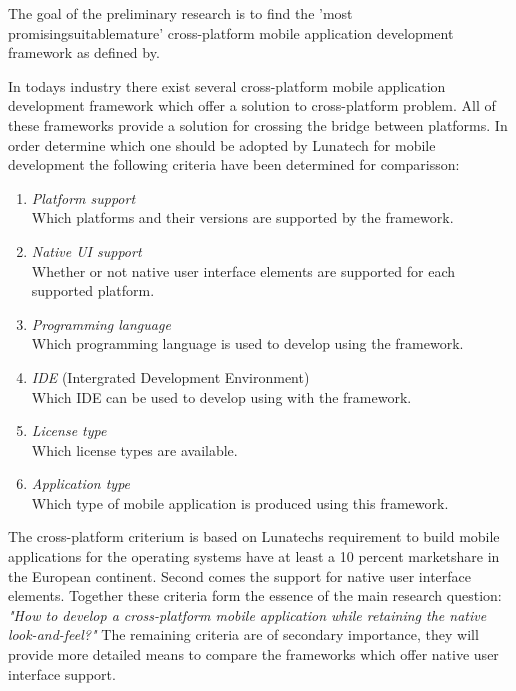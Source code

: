 
The goal of the preliminary research is to find the 'most promisingsuitablemature' cross-platform mobile application development framework as defined by.

In todays industry there exist several cross-platform mobile application development framework which offer a solution to cross-platform problem. All of these frameworks provide a solution for crossing the bridge between platforms. In order determine which one should be adopted by Lunatech for mobile development the following criteria have been determined for comparisson:

\begin{enumerate}
\item \emph{Platform support}\\
Which platforms and their versions are supported by the framework.
\item \emph{Native UI support}\\
Whether or not native user interface elements are supported for each supported platform.
\item \emph{Programming language}\\
Which programming language is used to develop using the framework.
\item \emph{IDE} (Intergrated Development Environment)\\
Which IDE can be used to develop using with the framework.
\item \emph{License type}\\
Which license types are available.
\item \emph{Application type}\\
Which type of mobile application is produced using this framework.
\end{enumerate}

The cross-platform criterium is based on Lunatechs requirement to build mobile applications for the operating systems have at least a 10 percent marketshare in the European continent. Second comes the support for native user interface elements. Together these criteria form the essence of the main research question: \emph{"How to develop a cross-platform mobile application while retaining the native look-and-feel?"}
The remaining criteria are of secondary importance, they will provide more detailed means to compare the frameworks which offer native user interface support.


